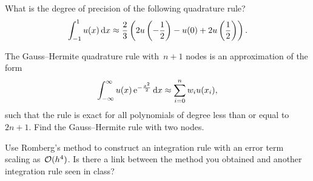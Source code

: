 \begin{exercise}
    What is the degree of precision of the following quadrature rule?
    \[
        \int_{-1}^{1} u(x) \, \mathrm d x \approx \frac{2}{3}  \left( 2 u\left(-\frac{1}{2}\right) - u(0) + 2 u\left(\frac{1}{2}\right) \right).
    \]
\end{exercise}

\begin{exercise}
    The Gauss--Hermite quadrature rule with~$n+1$ nodes is an approximation of the form
    \[
        \int_{-\infty}^{\infty} u(x) \, \mathrm e^{- \frac{x^2}{2}} \, \mathrm d x \approx \sum_{i=0}^{n} w_i u(x_i),
    \]
    such that the rule is exact for all polynomials of degree less than or equal to $2n+1$.
    Find the Gauss--Hermite rule with two nodes.
\end{exercise}

\begin{exercise}
    Use Romberg's method to construct an integration rule with an error term scaling as~$\mathcal O(h^4)$.
    Is there a link between the method you obtained and another integration rule seen in class?
\end{exercise}

